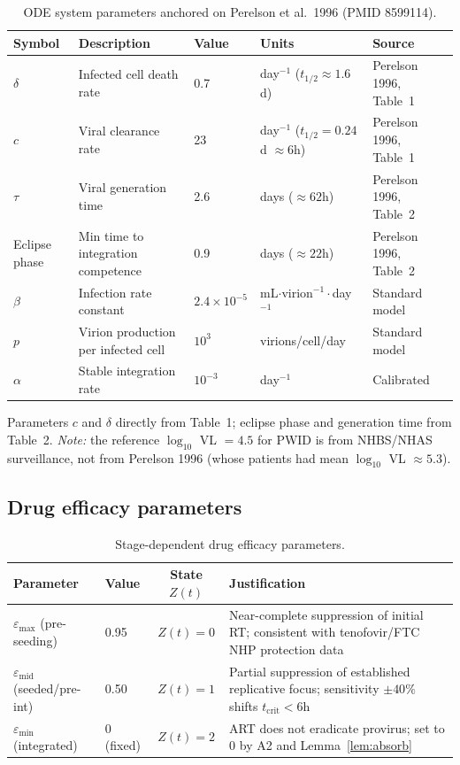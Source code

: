 \documentclass[11pt]{article}
\theoremstyle{definition}
\theoremstyle{remark}
\newcommand{\tcrit}{t_{\text{crit}}}
\newcommand{\emax}{\varepsilon_{\max}}
\newcommand{\emid}{\varepsilon_{\text{mid}}}
\newcommand{\emin}{\varepsilon_{\min}}
\begin{document}
\begin{table}[H]
\centering
\small
\caption{ODE system parameters anchored on Perelson et al.\ 1996 (PMID 8599114).}
\begin{tabular}{@{}llllp{4.5cm}@{}}
\toprule
\textbf{Symbol} & \textbf{Description} & \textbf{Value} & \textbf{Units} & \textbf{Source} \\
\midrule
$\delta$ & Infected cell death rate & 0.7 & day$^{-1}$ ($t_{1/2} \approx 1.6$d) & Perelson 1996, Table~1 \\
$c$ & Viral clearance rate & 23 & day$^{-1}$ ($t_{1/2} = 0.24$d $\approx 6$h) & Perelson 1996, Table~1 \\
$\tau$ & Viral generation time & 2.6 & days ($\approx 62$h) & Perelson 1996, Table~2 \\
Eclipse phase & Min time to integration competence & 0.9 & days ($\approx 22$h) & Perelson 1996, Table~2 \\
$\beta$ & Infection rate constant & $2.4 \times 10^{-5}$ & mL$\cdot$virion$^{-1}\cdot$day$^{-1}$ & Standard model \\
$p$ & Virion production per infected cell & $10^{3}$ & virions/cell/day & Standard model \\
$\alpha$ & Stable integration rate & $10^{-3}$ & day$^{-1}$ & Calibrated \\
\bottomrule
\end{tabular}
\end{table}

Parameters $c$ and $\delta$ directly from Table~1; eclipse phase and generation time from Table~2. \textit{Note:} the reference $\log_{10}$ VL $= 4.5$ for PWID is from NHBS/NHAS surveillance, not from Perelson 1996 (whose patients had mean $\log_{10}$ VL $\approx 5.3$).

\subsection{Drug efficacy parameters}

\begin{table}[H]
\centering
\small
\caption{Stage-dependent drug efficacy parameters.}
\begin{tabular}{@{}llcp{6.5cm}@{}}
\toprule
\textbf{Parameter} & \textbf{Value} & \textbf{State $Z(t)$} & \textbf{Justification} \\
\midrule
$\emax$ (pre-seeding) & 0.95 & $Z(t) = 0$ & Near-complete suppression of initial RT; consistent with tenofovir/FTC NHP protection data \\
$\emid$ (seeded/pre-int) & 0.50 & $Z(t) = 1$ & Partial suppression of established replicative focus; sensitivity $\pm 40\%$ shifts $\tcrit < 6$h \\
$\emin$ (integrated) & 0 (fixed) & $Z(t) = 2$ & ART does not eradicate provirus; set to 0 by A2 and Lemma~\ref{lem:absorb} \\
\bottomrule
\end{tabular}
\end{table}
\end{document}
